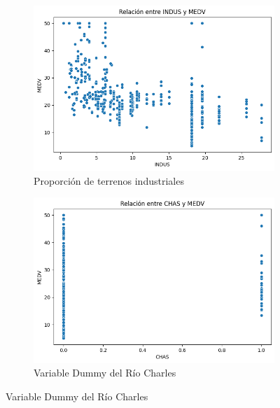 \documentclass[12pt,a4paper]{article}
\begin{document}
\begin{figure}[H]
\begin{subfigure}[t]{0.24\textwidth}
    \includegraphics[width=\textwidth]{images/indus_medv.png}
    \caption{\footnotesize Proporción de terrenos industriales}
    \label{fig:modelo_indus}
\end{subfigure}
\hfill
\begin{subfigure}[t]{0.24\textwidth}
    \centering
    \includegraphics[width=\textwidth]{images/chas_medv.png}
    \caption{\footnotesize Variable Dummy del Río Charles}
    \label{fig:modelo_chas}
\end{subfigure}

\vspace{0.2cm}


\end{figure}
\end{document}
